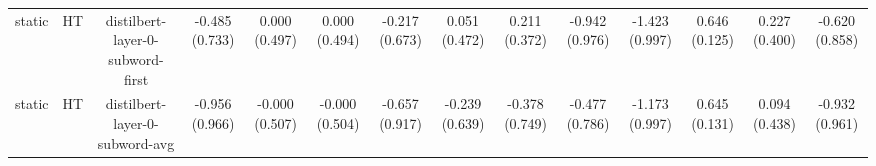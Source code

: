 \begin{sidewaystable}[htb]
\begin{tabular}{@{}cccccccccccccc@{}}
        static & HT & distilbert-layer-0-subword-first & -0.485 (0.733) & 0.000 (0.497) & 0.000 (0.494) & -0.217 (0.673) & 0.051 (0.472) & 0.211 (0.372) & -0.942 (0.976) & -1.423 (0.997) & 0.646 (0.125) & 0.227 (0.400) & -0.620 (0.858) \\
        static & HT & distilbert-layer-0-subword-avg & -0.956 (0.966) & -0.000 (0.507) & -0.000 (0.504) & -0.657 (0.917) & -0.239 (0.639) & -0.378 (0.749) & -0.477 (0.786) & -1.173 (0.997) & 0.645 (0.131) & 0.094 (0.438) & -0.932 (0.961) \\
        \bottomrule
    \end{tabular}
\end{sidewaystable}